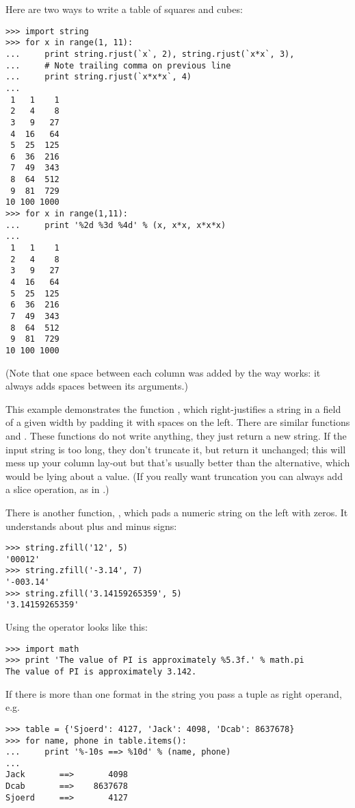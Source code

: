\documentclass{manual}
\begin{document}
Here are two ways to write a table of squares and cubes:

\begin{verbatim}
>>> import string
>>> for x in range(1, 11):
...     print string.rjust(`x`, 2), string.rjust(`x*x`, 3),
...     # Note trailing comma on previous line
...     print string.rjust(`x*x*x`, 4)
...
 1   1    1
 2   4    8
 3   9   27
 4  16   64
 5  25  125
 6  36  216
 7  49  343
 8  64  512
 9  81  729
10 100 1000
>>> for x in range(1,11):
...     print '%2d %3d %4d' % (x, x*x, x*x*x)
... 
 1   1    1
 2   4    8
 3   9   27
 4  16   64
 5  25  125
 6  36  216
 7  49  343
 8  64  512
 9  81  729
10 100 1000
\end{verbatim}

(Note that one space between each column was added by the way
 works: it always adds spaces between its arguments.)

This example demonstrates the function ,
which right-justifies a string in a field of a given width by padding
it with spaces on the left.  There are similar functions
 and .  These
functions do not write anything, they just return a new string.  If
the input string is too long, they don't truncate it, but return it
unchanged; this will mess up your column lay-out but that's usually
better than the alternative, which would be lying about a value.  (If
you really want truncation you can always add a slice operation, as in
.)

There is another function, , which pads a
numeric string on the left with zeros.  It understands about plus and
minus signs:

\begin{verbatim}
>>> string.zfill('12', 5)
'00012'
>>> string.zfill('-3.14', 7)
'-003.14'
>>> string.zfill('3.14159265359', 5)
'3.14159265359'
\end{verbatim}
%
Using the \code{\%} operator looks like this:

\begin{verbatim}
>>> import math
>>> print 'The value of PI is approximately %5.3f.' % math.pi
The value of PI is approximately 3.142.
\end{verbatim}

If there is more than one format in the string you pass a tuple as
right operand, e.g.

\begin{verbatim}
>>> table = {'Sjoerd': 4127, 'Jack': 4098, 'Dcab': 8637678}
>>> for name, phone in table.items():
...     print '%-10s ==> %10d' % (name, phone)
... 
Jack       ==>       4098
Dcab       ==>    8637678
Sjoerd     ==>       4127
\end{verbatim}
\end{document}
